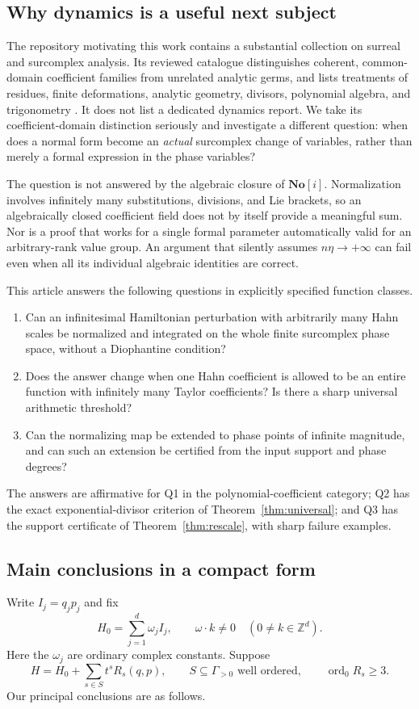 \documentclass[11pt,letterpaper]{article}
\numberwithin{equation}{section}
\theoremstyle{definition}
\theoremstyle{remark}
\newcommand{\Z}{\mathbb Z}
\newcommand{\No}{\mathbf{No}}
\newcommand{\ord}{\operatorname{ord}}
\begin{document}
\subsection{Why dynamics is a useful next subject}
The repository motivating this work contains a substantial collection on
surreal and surcomplex analysis. Its reviewed catalogue distinguishes
coherent, common-domain coefficient families from unrelated analytic germs,
and lists treatments of residues, finite deformations, analytic geometry,
divisors, polynomial algebra, and trigonometry \cite{repository}. It does not
list a dedicated dynamics report. We take its coefficient-domain distinction
seriously and investigate a different question: when does a normal form
become an \emph{actual} surcomplex change of variables, rather than merely a
formal expression in the phase variables?

The question is not answered by the algebraic closure of $\No[i]$.
Normalization involves infinitely many substitutions, divisions, and Lie
brackets, so an algebraically closed coefficient field does not by itself
provide a meaningful sum. Nor is a proof that works for a single formal
parameter automatically valid for an arbitrary-rank value group. An argument
that silently assumes $n\eta\to+\infty$ can fail even when all its individual
algebraic identities are correct.

This article answers the following questions in explicitly specified
function classes.
\begin{enumerate}[label=\textbf{Q\arabic*.},leftmargin=3em]
\item Can an infinitesimal Hamiltonian perturbation with arbitrarily many
Hahn scales be normalized and integrated on the whole finite surcomplex
phase space, without a Diophantine condition?
\item Does the answer change when one Hahn coefficient is allowed to be an
entire function with infinitely many Taylor coefficients? Is there a sharp
universal arithmetic threshold?
\item Can the normalizing map be extended to phase points of infinite
magnitude, and can such an extension be certified from the input support
and phase degrees?
\end{enumerate}
The answers are affirmative for Q1 in the polynomial-coefficient category;
Q2 has the exact exponential-divisor criterion of
Theorem~\ref{thm:universal}; and Q3 has the support certificate of
Theorem~\ref{thm:rescale}, with sharp failure examples.

\subsection{Main conclusions in a compact form}
Write $I_j=q_jp_j$ and fix
\begin{equation}\label{eq:H0intro}
 H_0=\sum_{j=1}^d\omega_j I_j,
 \qquad \omega\cdot k\ne0\quad(0\ne k\in\Z^d).
\end{equation}
Here the $\omega_j$ are ordinary complex constants. Suppose
\[
 H=H_0+\sum_{s\in S}t^s R_s(q,p),
 \qquad S\subseteq\Gamma_{>0}\text{ well ordered},
 \qquad \ord_0 R_s\ge3.
\]
Our principal conclusions are as follows.
\end{document}
